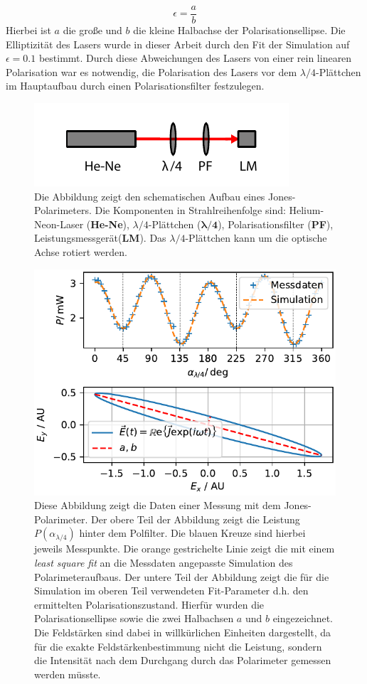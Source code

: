 \documentclass[titlepage,  ngerman]{article}
\begin{document}
	\begin{equation}
		\epsilon = \dfrac{a}{b}
	\end{equation}
	Hierbei ist $a$ die große und $b$ die kleine Halbachse der Polarisationsellipse. Die Elliptizität des Lasers wurde in dieser Arbeit durch den Fit der Simulation auf $\epsilon = 0.1 $ bestimmt. Durch diese Abweichungen des Lasers von einer rein linearen Polarisation war es notwendig, die Polarisation des Lasers vor dem $\lambda /4$-Plättchen im Hauptaufbau durch einen Polarisationsfilter festzulegen.
	\begin{figure}[h]
		\centering
		\includegraphics[width=0.5\linewidth]{figures/Polarimeter}
		\caption[Jones-Polarimeter]{Die Abbildung zeigt den schematischen Aufbau eines Jones-Polarimeters. Die Komponenten in Strahlreihenfolge sind: Helium-Neon-Laser (\textbf{He-Ne}), $\lambda/4$-Plättchen ($\boldsymbol{\lambda / 4}$), Polarisationsfilter (\textbf{PF}), Leistungsmessgerät(\textbf{LM}). Das $\lambda/4$-Plättchen kann um die optische Achse rotiert werden.}
		\label{fig:polarimeter}
	\end{figure}
	\begin{figure}[h]
		\centering
		\includegraphics[width=0.6\linewidth]{figures/new/3_2_graph_polarimeter}
		\caption[Polarimeter Simulation]{Diese Abbildung zeigt die Daten einer Messung mit dem Jones-Polarimeter. Der obere Teil der Abbildung zeigt die Leistung $P(\alpha_{\lambda /4})$ hinter dem Polfilter. Die blauen Kreuze sind hierbei jeweils Messpunkte. Die orange gestrichelte Linie zeigt die mit einem \textit{least square fit} an die Messdaten angepasste Simulation des Polarimeteraufbaus. Der untere Teil der Abbildung zeigt die für die Simulation im oberen Teil verwendeten Fit-Parameter d.h. den ermittelten Polarisationszustand. Hierfür wurden die Polarisationsellipse sowie die zwei Halbachsen $a$ und $b$ eingezeichnet. Die Feldstärken sind dabei in willkürlichen Einheiten dargestellt, da für die exakte Feldstärkenbestimmung nicht die Leistung, sondern die Intensität nach dem Durchgang durch das Polarimeter gemessen werden müsste.}
		\label{fig:graphpolarimeter}
	\end{figure}
\end{document}

